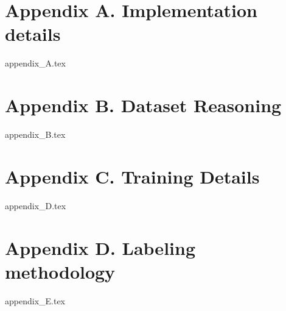 \documentclass{article}
\begin{document}




  
  

\section*{Appendix A. Implementation details}
{appendix_A.tex}

\section*{Appendix B. Dataset Reasoning}
{appendix_B.tex}



\section*{Appendix C. Training Details}
{appendix_D.tex}

\section*{Appendix D. Labeling methodology}
{appendix_E.tex}
\end{document}
